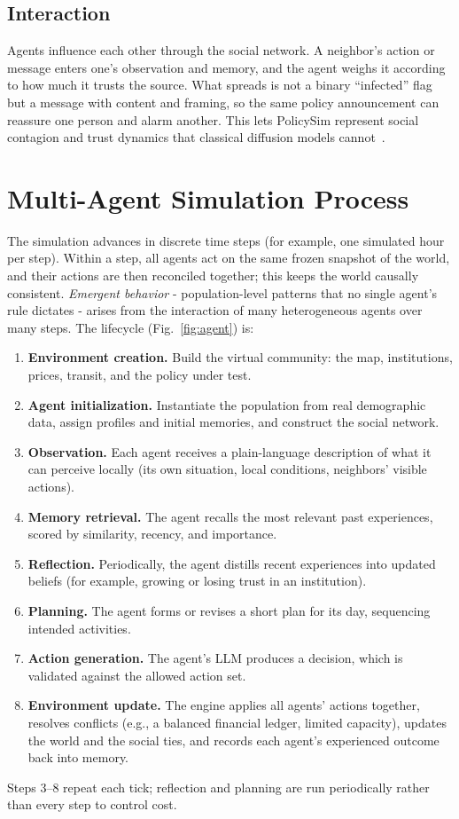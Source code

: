 \documentclass[conference]{IEEEtran}
\begin{document}
\subsection{Interaction}
Agents influence each other through the social network. A neighbor's action or message enters one's observation and memory, and the agent weighs it according to how much it trusts the source. What spreads is not a binary ``infected'' flag but a message with content and framing, so the same policy announcement can reassure one person and alarm another. This lets PolicySim represent social contagion and trust dynamics that classical diffusion models cannot~\cite{granovetter1978}.

\section{Multi-Agent Simulation Process}

The simulation advances in discrete time steps (for example, one simulated hour per step). Within a step, all agents act on the same frozen snapshot of the world, and their actions are then reconciled together; this keeps the world causally consistent. \emph{Emergent behavior} - population-level patterns that no single agent's rule dictates - arises from the interaction of many heterogeneous agents over many steps. The lifecycle (Fig.~\ref{fig:agent}) is:

\begin{enumerate}
\item \textbf{Environment creation.} Build the virtual community: the map, institutions, prices, transit, and the policy under test.
\item \textbf{Agent initialization.} Instantiate the population from real demographic data, assign profiles and initial memories, and construct the social network.
\item \textbf{Observation.} Each agent receives a plain-language description of what it can perceive locally (its own situation, local conditions, neighbors' visible actions).
\item \textbf{Memory retrieval.} The agent recalls the most relevant past experiences, scored by similarity, recency, and importance.
\item \textbf{Reflection.} Periodically, the agent distills recent experiences into updated beliefs (for example, growing or losing trust in an institution).
\item \textbf{Planning.} The agent forms or revises a short plan for its day, sequencing intended activities.
\item \textbf{Action generation.} The agent's LLM produces a decision, which is validated against the allowed action set.
\item \textbf{Environment update.} The engine applies all agents' actions together, resolves conflicts (e.g., a balanced financial ledger, limited capacity), updates the world and the social ties, and records each agent's experienced outcome back into memory.
\end{enumerate}
Steps 3--8 repeat each tick; reflection and planning are run periodically rather than every step to control cost.
\end{document}
